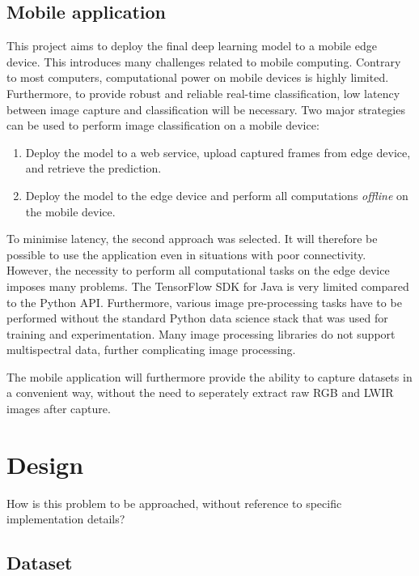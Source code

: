 \documentclass{l4proj}
\begin{document}
\section{Mobile application}

This project aims to deploy the final deep learning model to a mobile edge device. This introduces many challenges related to mobile computing. Contrary to most computers, computational power on mobile devices is highly limited. Furthermore, to provide robust and reliable real-time classification, low latency between image capture and classification will be necessary. Two major strategies can be used to perform image classification on a mobile device:

\begin{enumerate}
  \item Deploy the model to a web service, upload captured frames from edge device, and retrieve the prediction.
  \item Deploy the model to the edge device and perform all computations \textit{offline} on the mobile device.
\end{enumerate}

To minimise latency, the second approach was selected. It will therefore be possible to use the application even in situations with poor connectivity. However, the necessity to perform all computational tasks on the edge device imposes many problems. The TensorFlow SDK for Java is very limited compared to the Python API. Furthermore, various image pre-processing tasks have to be performed without the standard Python data science stack that was used for training and experimentation. Many image processing libraries do not support multispectral data, further complicating image processing.

The mobile application will furthermore provide the ability to capture datasets in a convenient way, without the need to seperately extract raw RGB and LWIR images after capture.



\chapter{Design}
How is this problem to be approached, without reference to specific implementation details? 


\section{Dataset}
\end{document}
